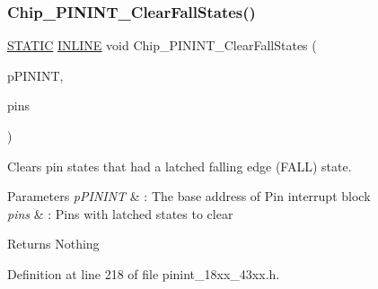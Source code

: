 \subsubsection{\texorpdfstring{Chip\+\_\+\+P\+I\+N\+I\+N\+T\+\_\+\+Clear\+Fall\+States()}{Chip\_PININT\_ClearFallStates()}}
{\footnotesize\ttfamily \hyperlink{group___l_p_c___types___public___macros_ga10b2d890d871e1489bb02b7e70d9bdfb}{S\+T\+A\+T\+IC} \hyperlink{spifi__18xx__43xx_8h_a2eb6f9e0395b47b8d5e3eeae4fe0c116}{I\+N\+L\+I\+NE} void Chip\+\_\+\+P\+I\+N\+I\+N\+T\+\_\+\+Clear\+Fall\+States (\begin{DoxyParamCaption}\item[{\hyperlink{struct_l_p_c___p_i_n___i_n_t___t}{L\+P\+C\+\_\+\+P\+I\+N\+\_\+\+I\+N\+T\+\_\+T} $\ast$}]{p\+P\+I\+N\+I\+NT,  }\item[{uint32\+\_\+t}]{pins }\end{DoxyParamCaption})}



Clears pin states that had a latched falling edge (F\+A\+LL) state. 


\begin{DoxyParams}{Parameters}
{\em p\+P\+I\+N\+I\+NT} & \+: The base address of Pin interrupt block \\
\hline
{\em pins} & \+: Pins with latched states to clear \\
\hline
\end{DoxyParams}
\begin{DoxyReturn}{Returns}
Nothing 
\end{DoxyReturn}


Definition at line 218 of file pinint\+\_\+18xx\+\_\+43xx.\+h.

\mbox{\label{group___p_i_n_i_n_t__18_x_x__43_x_x_ga0a1d6ec4462429278d065017109c8634}} 

